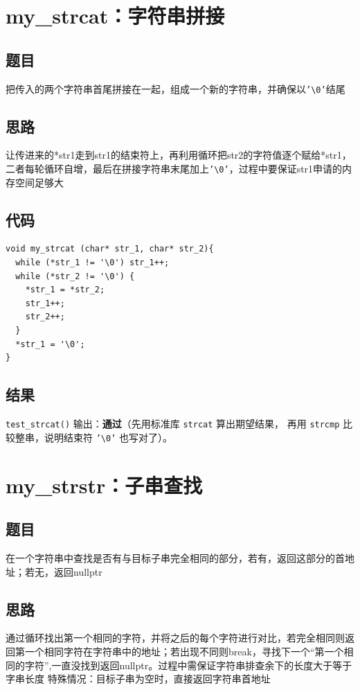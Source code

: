 \documentclass[11pt,a4paper]{ctexart}
\begin{document}
\section{my\_strcat：字符串拼接}
\subsection{题目}
把传入的两个字符串首尾拼接在一起，组成一个新的字符串，并确保以\texttt{'\textbackslash 0'}结尾
\subsection{思路}
让传进来的*str1走到str1的结束符上，再利用循环把str2的字符值逐个赋给*str1，二者每轮循环自增，最后在拼接字符串末尾加上\texttt{'\textbackslash 0'}，过程中要保证str1申请的内存空间足够大
\subsection{代码}
\begin{lstlisting}
void my_strcat (char* str_1, char* str_2){
  while (*str_1 != '\0') str_1++;
  while (*str_2 != '\0') {
    *str_1 = *str_2;
    str_1++;
    str_2++;
  }
  *str_1 = '\0';
}
\end{lstlisting}
\subsection{结果}
\texttt{test\_strcat()} 输出：\textbf{通过}（先用标准库 \texttt{strcat} 算出期望结果，
再用 \texttt{strcmp} 比较整串，说明结束符 \texttt{'\textbackslash 0'} 也写对了）。
\section{my\_strstr：子串查找}
\subsection{题目}
在一个字符串中查找是否有与目标子串完全相同的部分，若有，返回这部分的首地址；若无，返回nullptr
\subsection{思路}
通过循环找出第一个相同的字符，并将之后的每个字符进行对比，若完全相同则返回第一个相同字符在字符串中的地址；若出现不同则break，寻找下一个“第一个相同的字符”,一直没找到返回nullptr。过程中需保证字符串排查余下的长度大于等于字串长度
特殊情况：目标子串为空时，直接返回字符串首地址
\end{document}
